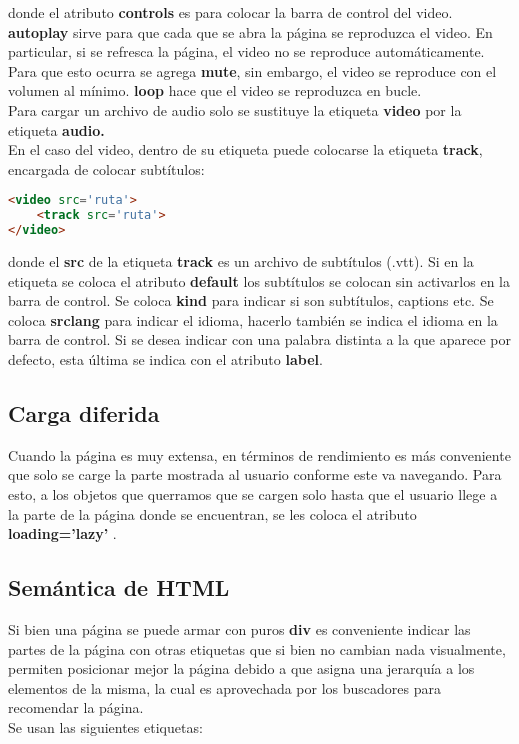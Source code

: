 \documentclass[10pt,oneside]{article}
\begin{document}
\begin{multicols}{2}
    donde el atributo \textbf{controls} es para colocar la barra de control del video. \textbf{autoplay} sirve para que cada que se abra la página se reproduzca el video. En particular, si se refresca la página, el video no se reproduce automáticamente. Para que esto ocurra se agrega \textbf{mute}, sin embargo, el video se reproduce con el volumen al mínimo. \textbf{loop} hace que el video se reproduzca en bucle.\\ \newline Para cargar un archivo de audio solo se sustituye la etiqueta \textbf{video} por la etiqueta \textbf{audio.} \\\newline En el caso del video, dentro de su etiqueta puede colocarse la etiqueta \textbf{track}, encargada de colocar subtítulos:

    \begin{lstlisting}[language=HTML]
<video src='ruta'>
    <track src='ruta'>
</video>       
    \end{lstlisting}

    donde el \textbf{src} de la etiqueta \textbf{track} es un archivo de subtítulos (.vtt). Si en la etiqueta se coloca el atributo \textbf{default} los subtítulos se colocan sin activarlos en la barra de control. Se coloca \textbf{kind} para indicar si son subtítulos, captions etc. Se coloca \textbf{srclang} para indicar el idioma, hacerlo  también se indica el idioma en la barra de control. Si se desea indicar con una palabra distinta a la que aparece por defecto, esta última se indica con el atributo \textbf{label}.

\subsection{Carga diferida}

    Cuando la página es muy extensa, en términos de rendimiento es más conveniente que solo se carge la parte mostrada al usuario conforme este va navegando. Para esto, a los objetos que querramos que se cargen solo hasta que el usuario llege a la parte de la página donde se encuentran, se les coloca el atributo \textbf{loading='lazy'} .
    
\subsection{Semántica de HTML}

    Si bien una página se puede armar con puros \textbf{div} es conveniente indicar las partes de la página con otras etiquetas que si bien no cambian nada visualmente, permiten posicionar mejor la página debido a que asigna una jerarquía a los elementos de la misma, la cual es aprovechada por los buscadores para recomendar la página.\\ \newline Se usan las siguientes etiquetas:


\end{multicols}
\end{document}
